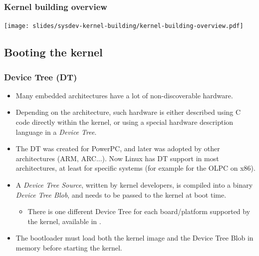 \begin{frame}
  \frametitle{Kernel building overview}
  \begin{center}
    \texttt{[image: slides/sysdev-kernel-building/kernel-building-overview.pdf]}
  \end{center}
\end{frame}

\subsection{Booting the kernel}

\begin{frame}
  \frametitle{Device Tree (DT)}
  \begin{itemize}
  \item Many embedded architectures have a lot of non-discoverable
    hardware.
  \item Depending on the architecture, such hardware is either
    described using C code directly within the kernel, or using a
    special hardware description language in a {\em Device Tree}.
  \item The DT was created for PowerPC, and later was
    adopted by other architectures (ARM, ARC...). Now Linux
    has DT support in most architectures, at least for specific
    systems (for example for the OLPC on x86).
  \item A {\em Device Tree Source}, written by kernel developers,
    is compiled into a binary {\em Device Tree Blob}, and needs to
    be passed to the kernel at boot time.
    \begin{itemize}
    \item There is one different Device Tree for each board/platform
      supported by the kernel, available in
      .
    \end{itemize}
  \item The bootloader must load both the kernel image and the Device
    Tree Blob in memory before starting the kernel.
  \end{itemize}
\end{frame}


